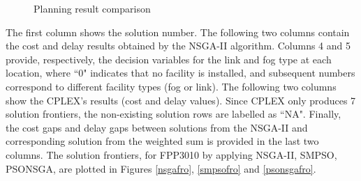 \documentclass[10pt,journal,compsoc]{IEEEtran}
\begin{document}
   \begin{figure}[!t]   %
\hfil
    \caption{Planning result comparison}
\end{figure}


The first column shows the solution number. The following two columns contain the cost and delay results obtained by the NSGA-II algorithm. Columns 4 and 5 provide, respectively, the decision variables for the link and fog type at each location, where ``0" indicates that no facility is installed, and subsequent numbers correspond to different facility types (fog or link). The following two columns show the CPLEX's results (cost and delay values). Since CPLEX only produces 7 solution frontiers, the non-existing solution rows are labelled as ``NA". Finally, the cost gaps and delay gaps between solutions from the NSGA-II and corresponding solution from the weighted sum is provided in the last two columns. 
The solution frontiers, for FPP3010 by applying NSGA-II, SMPSO, PSONSGA, are plotted in Figures \ref{nsgafro}, \ref{smpsofro} and \ref{psonsgafro}.
\end{document}
